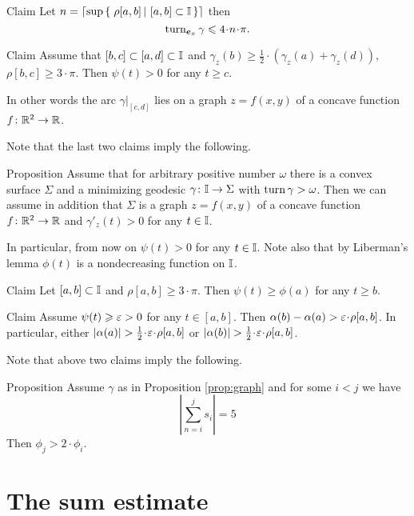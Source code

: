 \documentclass[a4paper,10pt]{amsart}
\begin{document}
\begin{thm}{Claim}\label{clm:rotations}
Let $n=\lceil \sup\set{\rho[a,b]}{[a,b]\subset\II} \rceil$
then \[\turn_{\bm{e}_x}\gamma\le 4\cdot n\cdot\pi.\]

\end{thm}


\begin{thm}{Claim}
Assume that $[b,c]\subset [a,d]\subset \mathbb{I}$ and
$\gamma_z(b)
\ge
\tfrac12\cdot(\gamma_z(a)+\gamma_z(d))$,
$\rho[b,c]\ge 3\cdot \pi$.
Then $\psi(t)>0$ for any $t\ge c$.

In other words the arc $\gamma|_{[c,d]}$ lies on a graph $z=f(x,y)$ of a concave function $f\colon\mathbb{R}^2\to\mathbb{R}$.
\end{thm}

Note that the last two claims imply the following.

\begin{thm}{Proposition}\label{prop:graph}
Assume that for arbitrary positive number $\omega$ there is a convex surface $\Sigma$ and a minimizing geodesic $\gamma\colon\mathbb{I}\to \Sigma$ with $\mathop{\rm turn}\nolimits \gamma>\omega$.
Then we can assume in addition that $\Sigma$ is a graph $z=f(x,y)$ of a concave function $f\colon\mathbb{R}^2\to\mathbb{R}$
and $\gamma'_z(t)>0$ for any $t\in\mathbb{I}$. 
\end{thm}

In particular, from now on $\psi(t)>0$ for any $t\in\mathbb{I}$.
Note also that by Liberman's lemma $\phi(t)$ is a nondecreasing function on $\mathbb{I}$.

\begin{thm}{Claim}
Let $[a,b]\subset\mathbb{I}$ and $\rho[a,b]\ge 3\cdot\pi$.
Then $\psi(t)\ge \phi(a)$ for any $t\ge b$.
\end{thm}


\begin{thm}{Claim}
Assume  
$\psi(t)\geqslant \varepsilon>0$ for any $t\in [a,b]$.
Then 
$\alpha(b)-\alpha(a)>\eps\cdot\rho[a,b]$.
In particular, either $|\alpha(a)|>\tfrac12\cdot\eps\cdot\rho[a,b]$ or $|\alpha(b)|>\tfrac12\cdot\eps\cdot\rho[a,b]$.
\end{thm}

Note that above two claims imply the following.

\begin{thm}{Proposition}
Assume $\gamma$ as in Proposition \ref{prop:graph}
and for some $i<j$ we have
\[\left|\sum_{n=i}^js_i\right|=5\]
Then $\phi_j>2\cdot\phi_i$.
\end{thm}



\section{The sum estimate}
\end{document}
